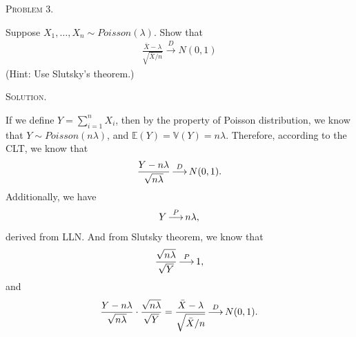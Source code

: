 \documentclass{article}
\begin{document}
\begin{CJK}{UTF8}{gbsn}
    \begin{shaded}
        \noindent\textsc{Problem 3.}\par
        Suppose $X_1,\ldots,X_n\sim Poisson(\lambda)$. Show that
        \begin{align}
            \frac{\bar{X}-\lambda}{\sqrt{\bar{X}/n}} \mathop{\longrightarrow}\limits^DN(0,1)
        \end{align}
        (Hint: Use Slutsky's theorem.)
    \end{shaded}
    \noindent\textsc{Solution.}\par
    If we define $Y=\sum_{i=1}^n X_i$, then by the property of Poisson distribution,
    we know that $Y\sim Poisson(n\lambda)$, and $\mathbb{E}(Y)=\mathbb{V}(Y) = n\lambda$.
    Therefore, according to the CLT, we know that
    \begin{align}
        \frac{Y-n\lambda}{\sqrt{n\lambda}} \mathop{\longrightarrow}\limits^D N(0,1).\notag
    \end{align}
    Additionally, we have
    \begin{align}
        Y\mathop{\longrightarrow}\limits^P n\lambda,\notag
    \end{align}
    derived from LLN. And from Slutsky theorem, we know that
    \begin{align}
        \frac{\sqrt{n\lambda}}{\sqrt{Y}} \mathop{\longrightarrow}\limits^P 1,\notag
    \end{align}
    and
    \begin{align}
        \frac{Y-n\lambda}{\sqrt{n\lambda}} \cdot \frac{\sqrt{n\lambda}}{\sqrt{Y}} =\frac{\bar{X}-\lambda}{\sqrt{\bar{X}/n}}  \mathop{\longrightarrow}\limits^D N(0, 1).\notag
    \end{align}



\end{CJK}
\end{document}
